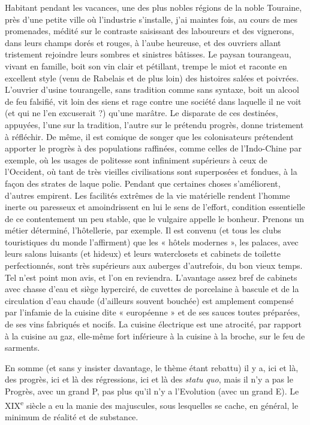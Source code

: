 \documentclass[french,twoside]{book} %
\begin{document}
Habitant pendant les vacances, une des plus nobles régions de la noble Touraine, près d’une petite ville où l’industrie s’installe, j’ai maintes fois, au cours de mes promenades, médité sur le contraste saisissant des laboureurs et des vignerons, dans leurs champs dorés et rouges, à l’aube heureuse, et des ouvriers allant tristement rejoindre leurs sombres et sinistres bâtisses. Le paysan tourangeau, vivant en famille, boit son vin clair et pétillant, trempe le miot et raconte en excellent style (venu de Rabelais et de plus loin) des histoires salées et poivrées. L’ouvrier d’usine tourangelle, sans tradition comme sans syntaxe, boit un alcool de feu falsifié, vit loin des siens et rage contre une société dans laquelle il ne voit (et qui ne l’en excuserait ?) qu’une marâtre. Le disparate de ces destinées, appuyées, l’une sur la tradition, l’autre sur le prétendu progrès, donne tristement à réfléchir. De même, il est comique de songer que les colonisateurs prétendent apporter le progrès à des populations raffinées, comme celles de l’Indo-Chine par exemple, où les usages de politesse sont infiniment supérieurs à ceux de l’Occident, où tant de très vieilles civilisations sont superposées et fondues, à la façon des strates de laque polie. Pendant que certaines choses s’améliorent, d’autres empirent. Les facilités extrêmes de la vie matérielle rendent l’homme inerte ou paresseux et amoindrissent en lui le sens de l’effort, condition essentielle de ce contentement un peu stable, que le vulgaire appelle le bonheur. Prenons un métier déterminé, l’hôtellerie, par exemple. Il est convenu (et tous les clubs touristiques du monde l’affirment) que les « hôtels modernes », les palaces, avec leurs salons luisants (et hideux) et leurs waterclosets et cabinets de toilette perfectionnés, sont très supérieurs aux auberges d’autrefois, du bon vieux temps. Tel n’est point mon avis, et l’on en reviendra. L’avantage assez bref de cabinets avec chasse d’eau et siège hyperciré, de cuvettes de porcelaine à bascule et de la circulation d’eau chaude (d’ailleurs souvent bouchée) est amplement compensé par l’infamie de la cuisine dite « européenne » et de ses sauces toutes préparées, de ses vins fabriqués et nocifs. La cuisine électrique est une atrocité, par rapport à la cuisine au gaz, elle-même fort inférieure à la cuisine à la broche, sur le feu de sarments.\par
En somme (et sans y insister davantage, le thème étant rebattu) il y a, ici et là, des progrès, ici et là des régressions, ici et là des {\itshape statu quo}, mais il n’y a pas le Progrès, avec un grand P, pas plus qu’il n’y a l’Evolution (avec un grand E). Le XIX\textsuperscript{e} siècle a eu la manie des majuscules, sous lesquelles se cache, en général, le minimum de réalité et de substance.\par
\end{document}
